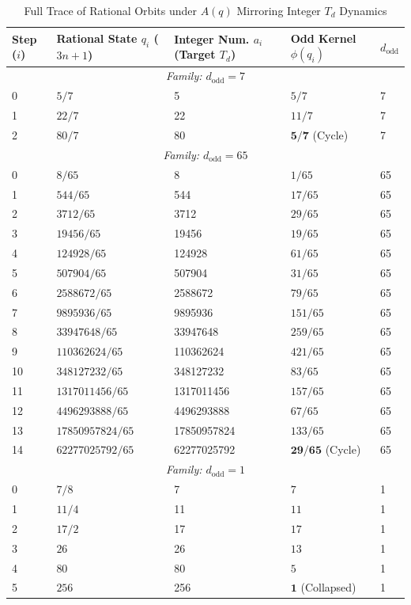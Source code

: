 \documentclass[11pt, a4paper]{article}
\theoremstyle{definition}
\begin{document}
\begin{table}[htbp]
\centering
\caption{Full Trace of Rational Orbits under $A(q)$ Mirroring Integer $T_d$ Dynamics}
\label{tab:isomorphism_trace}
\begin{tabular}{l l l l l}
\toprule
Step ($i$) & Rational State $q_i$ ($3n+1$) & Integer Num. $a_i$ (Target $T_d$) & Odd Kernel $\phi(q_i)$ & $d_{\text{odd}}$ \\ \midrule
\multicolumn{5}{c}{\textit{Family: $d_{\text{odd}} = 7$}} \\
0 & $5/7$ & 5 & $5/7$ & 7 \\
1 & $22/7$ & 22 & $11/7$ & 7 \\
2 & $80/7$ & 80 & $\mathbf{5/7}$ (Cycle) & 7 \\ \midrule
\multicolumn{5}{c}{\textit{Family: $d_{\text{odd}} = 65$}} \\
0 & $8/65$ & 8 & $1/65$ & 65 \\
1 & $544/65$ & 544 & $17/65$ & 65 \\
2 & $3712/65$ & 3712 & $29/65$ & 65 \\
3 & $19456/65$ & 19456 & $19/65$ & 65 \\
4 & $124928/65$ & 124928 & $61/65$ & 65 \\
5 & $507904/65$ & 507904 & $31/65$ & 65 \\
6 & $2588672/65$ & 2588672 & $79/65$ & 65 \\
7 & $9895936/65$ & 9895936 & $151/65$ & 65 \\
8 & $33947648/65$ & 33947648 & $259/65$ & 65 \\
9 & $110362624/65$ & 110362624 & $421/65$ & 65 \\
10 & $348127232/65$ & 348127232 & $83/65$ & 65 \\
11 & $1317011456/65$ & 1317011456 & $157/65$ & 65 \\
12 & $4496293888/65$ & 4496293888 & $67/65$ & 65 \\
13 & $17850957824/65$ & 17850957824 & $133/65$ & 65 \\
14 & $62277025792/65$ & 62277025792 & $\mathbf{29/65}$ (Cycle) & 65 \\ \midrule
\multicolumn{5}{c}{\textit{Family: $d_{\text{odd}} = 1$}} \\
0 & $7/8$ & 7 & $7$ & 1 \\
1 & $11/4$ & 11 & $11$ & 1 \\
2 & $17/2$ & 17 & $17$ & 1 \\
3 & $26$ & 26 & $13$ & 1 \\
4 & $80$ & 80 & $5$ & 1 \\
5 & $256$ & 256 & $\mathbf{1}$ (Collapsed) & 1 \\
\bottomrule
\end{tabular}
\end{table}
\end{document}
